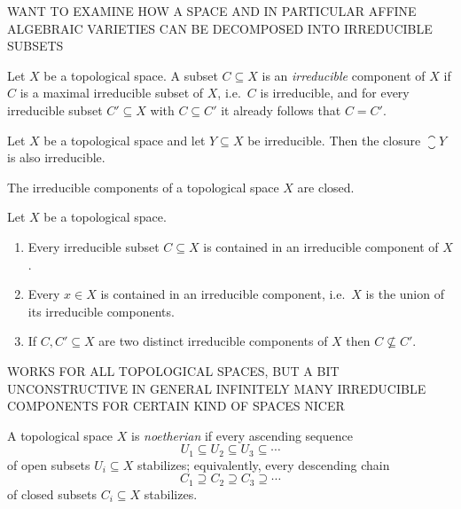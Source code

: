 \begin{fluff}
  WANT TO EXAMINE HOW A SPACE AND IN PARTICULAR AFFINE ALGEBRAIC VARIETIES CAN BE DECOMPOSED INTO IRREDUCIBLE SUBSETS
\end{fluff}


\begin{definition}
  Let $X$ be a topological space.
  A subset $C \subseteq X$ is an \emph{irreducible} component of $X$ if $C$ is a maximal irreducible subset of $X$, i.e.\ $C$ is irreducible, and for every irreducible subset $C' \subseteq X$ with $C \subseteq C'$ it already follows that $C = C'$.
\end{definition}


\begin{lemma}
  Let $X$ be a topological space and let $Y \subseteq X$ be irreducible.
  Then the closure $\closure{Y}$ is also irreducible.
\end{lemma}


\begin{corollary}
  The irreducible components of a topological space $X$ are closed.
\end{corollary}


\begin{proposition}
  Let $X$ be a topological space.
  \begin{enumerate}
    \item
      Every irreducible subset $C \subseteq X$ is contained in an irreducible component of $X$.
    \item
      Every $x \in X$ is contained in an irreducible component, i.e.\ $X$ is the union of its irreducible components.
    \item
      If $C, C' \subseteq X$ are two distinct irreducible components of $X$ then $C \nsubseteq C'$.
  \end{enumerate}
\end{proposition}


\begin{fluff}
  WORKS FOR ALL TOPOLOGICAL SPACES, BUT A BIT UNCONSTRUCTIVE
  IN GENERAL INFINITELY MANY IRREDUCIBLE COMPONENTS
  FOR CERTAIN KIND OF SPACES NICER
\end{fluff}


\begin{definition}
  A topological space $X$ is \emph{noetherian} if every ascending sequence
  \[
              U_1
    \subseteq U_2
    \subseteq U_3
    \subseteq \dotsb
  \]
  of open subsets $U_i \subseteq X$ stabilizes;
  equivalently, every descending chain
  \[
              C_1
    \supseteq C_2
    \supseteq C_3
    \supseteq \dotsb
  \]
  of closed subsets $C_i \subseteq X$ stabilizes.
\end{definition}


